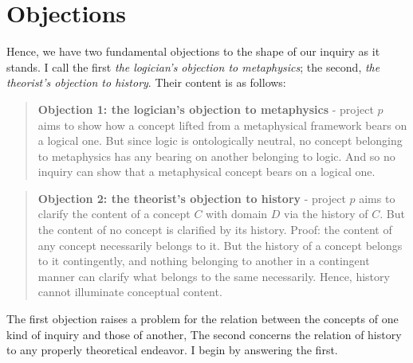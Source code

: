 \documentclass[]{article}
\begin{document}
\section{Objections}
Hence, we have two fundamental objections to the shape of our inquiry as it stands. I call the first \textit{the logician's objection to metaphysics}; the second, \textit{the theorist's objection to history}. Their content is as follows: 
\begin{quote}
\textbf{Objection 1: the logician's objection to metaphysics} - project $p$ aims to show how a concept lifted from a metaphysical framework bears on a logical one. But since logic is ontologically neutral, no concept belonging to metaphysics has any bearing on another belonging to logic. And so no inquiry can show that a metaphysical concept bears on a logical one.
\end{quote}
\begin{quote}
\textbf{Objection 2: the theorist's objection to history} - project $p$ aims to clarify the content of a concept $C$ with domain $D$ via the history of $C$. But the content of no concept is clarified by its history. Proof: the content of any concept necessarily belongs to it. But the history of a concept belongs to it contingently, and nothing belonging to another in a contingent manner can clarify what belongs to the same necessarily. Hence, history cannot illuminate conceptual content.
\end{quote}
The first objection raises a problem for the relation between the concepts of one kind of inquiry and those of another, The second concerns the relation of history to any properly theoretical endeavor. I begin by answering the first.
\end{document}
